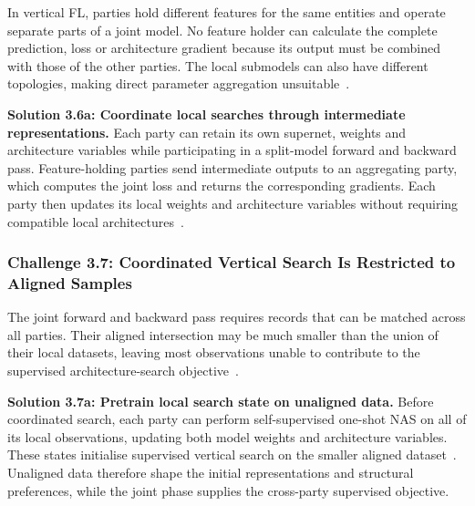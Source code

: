 In vertical FL, parties hold different features for the same entities and operate separate parts of a joint model. No feature holder can calculate the complete prediction, loss or architecture gradient because its output must be combined with those of the other parties. The local submodels can also have different topologies, making direct parameter aggregation unsuitable~\cite{self-supervised_vertical_fednas_2023}.

\noindent\textbf{Solution 3.6a: Coordinate local searches through intermediate representations.} Each party can retain its own supernet, weights and architecture variables while participating in a split-model forward and backward pass. Feature-holding parties send intermediate outputs to an aggregating party, which computes the joint loss and returns the corresponding gradients. Each party then updates its local weights and architecture variables without requiring compatible local architectures~\cite{self-supervised_vertical_fednas_2023}.

\subsubsection{Challenge 3.7: Coordinated Vertical Search Is Restricted to Aligned Samples}

The joint forward and backward pass requires records that can be matched across all parties. Their aligned intersection may be much smaller than the union of their local datasets, leaving most observations unable to contribute to the supervised architecture-search objective~\cite{self-supervised_vertical_fednas_2023}.

\noindent\textbf{Solution 3.7a: Pretrain local search state on unaligned data.} Before coordinated search, each party can perform self-supervised one-shot NAS on all of its local observations, updating both model weights and architecture variables. These states initialise supervised vertical search on the smaller aligned dataset~\cite{self-supervised_vertical_fednas_2023}. Unaligned data therefore shape the initial representations and structural preferences, while the joint phase supplies the cross-party supervised objective.
